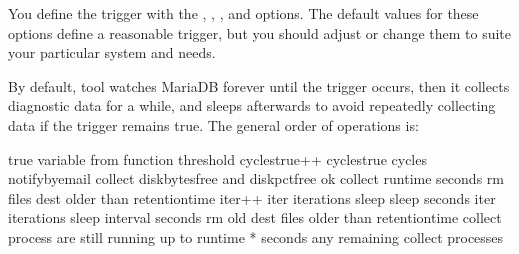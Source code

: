\documentclass[letterpaper,10pt,english]{sphinxmanual}
\begin{document}
\sphinxAtStartPar
You define the trigger with the {\hyperref[\detokenize{mariadb-stat:cmdoption-mariadb-stat-function}]{}}, {\hyperref[\detokenize{mariadb-stat:cmdoption-mariadb-stat-variable}]{}},
{\hyperref[\detokenize{mariadb-stat:cmdoption-mariadb-stat-threshold}]{}}, and {\hyperref[\detokenize{mariadb-stat:cmdoption-mariadb-stat-cycles}]{}} options.  The default values
for these options define a reasonable trigger, but you should adjust
or change them to suite your particular system and needs.

\sphinxAtStartPar
By default,  tool watches MariaDB forever until the trigger occurs,
then it collects diagnostic data for a while, and sleeps afterwards to avoid
repeatedly collecting data if the trigger remains true.  The general order of
operations is:

\begin{sphinxVerbatim}[commandchars=\\\{\}]
 true 
    \PYGZhy{}\PYGZhy{}variable from \PYGZhy{}\PYGZhy{}function \PYGZgt{} \PYGZhy{}\PYGZhy{}threshold 
      cycles\PYGZus{}true++
       cycles\PYGZus{}true \PYGZgt{} \PYGZhy{}\PYGZhy{}cycles 
         \PYGZhy{}\PYGZhy{}notify\PYGZhy{}by\PYGZhy{}email
          \PYGZhy{}\PYGZhy{}collect 
             \PYGZhy{}\PYGZhy{}disk\PYGZhy{}bytes\PYGZhy{}free and \PYGZhy{}\PYGZhy{}disk\PYGZhy{}pct\PYGZhy{}free ok 
               \PYGZhy{}\PYGZhy{}collect  \PYGZhy{}\PYGZhy{}run\PYGZhy{}time seconds 
            rm files  \PYGZhy{}\PYGZhy{}dest older than \PYGZhy{}\PYGZhy{}retention\PYGZhy{}time
         iter++
       iter \PYGZlt{} \PYGZhy{}\PYGZhy{}iterations 
         sleep \PYGZhy{}\PYGZhy{}sleep seconds
       iter \PYGZlt{} \PYGZhy{}\PYGZhy{}iterations 
         sleep \PYGZhy{}\PYGZhy{}interval seconds
rm old \PYGZhy{}\PYGZhy{}dest files older than \PYGZhy{}\PYGZhy{}retention\PYGZhy{}time
 \PYGZhy{}\PYGZhy{}collect process are still running 
    up to \PYGZhy{}\PYGZhy{}run\PYGZhy{}time *  seconds
    any remaining \PYGZhy{}\PYGZhy{}collect processes
\end{sphinxVerbatim}
\end{document}
